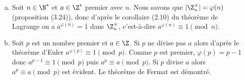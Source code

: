 \begin{enumerate}[a)]
  \item Soit $n\in\N^*$ et $a\in\Z^*$ premier avec $n$. Nous savons que
    $|\Z^\times_n|=\varphi(n)$ (proposition (3.24)), donc d'après le corollaire
    (2.10) du théorème de Lagrange on a $\overline{a}^{\varphi(n)}=\overline{1}$
    dans $\Z^\times_n$, c'est-à-dire $a^{\varphi(n)}\equiv 1\pmod{n}$.

  \item Soit $p$ est un nombre premier et $a\in\Z$. Si $p$ ne divise pas $a$
    alors d'après le théorème d'Euler $a^{\varphi(p)}\equiv 1\pmod{p}$.  Comme
    $p$ est premier, $\varphi(p)=p-1$ donc $a^{p-1}\equiv 1\pmod{p}$ puis
    $a^p\equiv a\pmod{p}$. Si $p$ divise $a$ alors $a^p\equiv a\pmod{p}$ est
    évident. Le théorème de Fermat est démontré.
\end{enumerate}


